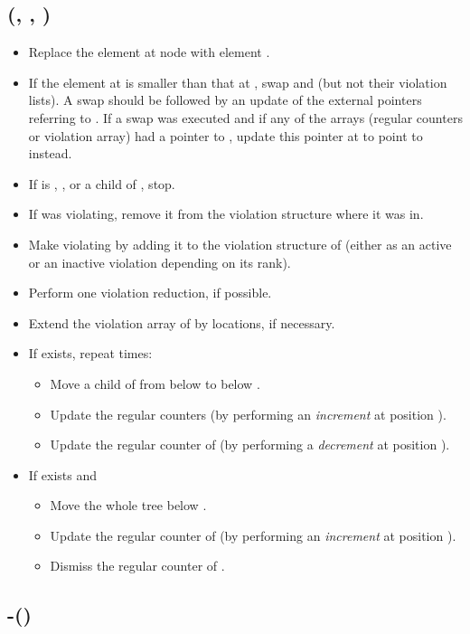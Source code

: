 \documentclass{llncs}
\newcommand{\Deletemin}{\mbox{\mbox{\rm -}}}
\newcommand{\Decrease}{\mbox{}}
\begin{document}
\subsection*{\Decrease{}(, , )}

\begin{itemize}
\item Replace the element at node  with element .
\item If the element at  is smaller than that at ,
 swap  and  (but not their violation lists).
A swap should be followed by an update of the external
pointers referring to . If a swap was executed and
 if any of the arrays (regular counters or violation array) had a pointer
  to , update this pointer at  to point to 
  instead. 
\item If  is , , or a child of ,
 stop.
\item If  was violating,
 remove it from the violation structure where it was in.
\item Make  violating by adding it to the violation structure of
   (either as an active or an inactive violation depending on
  its rank).
\item Perform one violation reduction, if possible.
\item Extend the violation array of  by  locations, if necessary.
\item If  exists, repeat  times: 
   \begin{itemize}
    \item Move a child of  from below  to below .
    \item  Update the regular counters  (by performing an {\it increment} at position ).
    \item  Update the regular counter of  (by performing a {\it decrement} at position ).
   \end{itemize}
\item If  exists and 
	\begin{itemize} 
		\item  Move the whole tree  below .
	  \item  Update the regular counter of  (by performing an {\it increment} at position ).
	  \item  Dismiss the regular counter of .
  \end{itemize}  
\end{itemize}

\subsection*{\Deletemin{}()}
\end{document}
